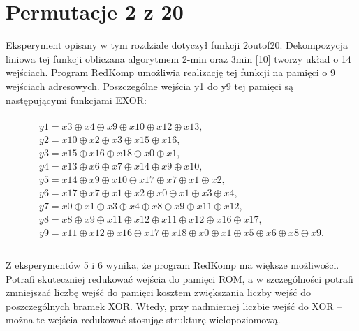 \section{Permutacje 2 z 20}

Eksperyment opisany w tym rozdziale dotyczył funkcji 2outof20.
Dekompozycja liniowa tej funkcji obliczana algorytmem 2-min oraz 3min [10] tworzy układ o 14 wejściach.
Program RedKomp umożliwia realizację tej funkcji na pamięci o 9 wejściach adresowych.
Poszczególne wejścia y1 do y9 tej pamięci są następującymi funkcjami EXOR:

\begin{multline} \\
y1 = x3 \oplus x4 \oplus x9 \oplus x10 \oplus x12 \oplus x13, \\
y2 = x10 \oplus x2 \oplus x3 \oplus x15 \oplus x16, \\
y3 = x15 \oplus x16 \oplus x18 \oplus x0 \oplus x1, \\
y4 = x13 \oplus x6 \oplus x7 \oplus x14 \oplus x9 \oplus x10, \\
y5 = x14 \oplus x9 \oplus x10 \oplus x17 \oplus x7 \oplus x1 \oplus x2, \\
y6 = x17 \oplus x7 \oplus x1 \oplus x2 \oplus x0 \oplus x1 \oplus x3 \oplus x4, \\
y7 = x0 \oplus x1 \oplus x3 \oplus x4 \oplus x8 \oplus x9 \oplus x11 \oplus x12, \\
y8 = x8 \oplus x9 \oplus x11 \oplus x12 \oplus x11 \oplus x12 \oplus x16 \oplus x17, \\
y9 = x11 \oplus x12 \oplus x16 \oplus x17 \oplus x18 \oplus x0 \oplus x1 \oplus x5 \oplus x6 \oplus x8 \oplus x9. \\
\end{multline} \\

Z eksperymentów 5 i 6 wynika, że program RedKomp ma większe możliwości.
Potrafi skuteczniej redukować wejścia do pamięci ROM,
a w szczególności potrafi zmniejszać liczbę wejść do pamięci
kosztem zwiększania liczby wejść do poszczególnych bramek XOR.
Wtedy, przy nadmiernej liczbie wejść do XOR – można te wejścia redukować stosując strukturę wielopoziomową.
